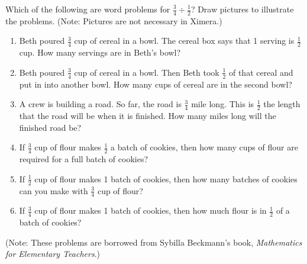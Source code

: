 \documentclass{ximera}
\begin{document}
\newpage 
\begin{problem}
Which of the following are word problems for $\frac{3}{4} \div \frac{1}{2}$?  Draw pictures to illustrate the problems.  (Note: Pictures are not necessary in Ximera.)

\begin{enumerate}
\item Beth poured $\frac{3}{4}$ cup of cereal in a bowl.  The cereal box says that 1 serving is $\frac{1}{2}$ cup.  How many servings are in Beth's bowl? 

\item Beth poured $\frac{3}{4}$ cup of cereal in a bowl.  Then Beth took $\frac{1}{2}$ of that cereal and put in into another bowl.  How many cups of cereal are in the second bowl? 

\item A crew is building a road.  So far, the road is $\frac{3}{4}$ mile long.  This is $\frac{1}{2}$ the length that the road will be when it is finished.  How many miles long will the finished road be? 
\item If $\frac{3}{4}$ cup of flour makes $\frac{1}{2}$ a batch of cookies, then how many cups of flour are required for a full batch of cookies?  

\item If $\frac{1}{2}$ cup of flour makes 1 batch of cookies, then how many batches of cookies can you make with $\frac{3}{4}$ cup of flour?  

\item If $\frac{3}{4}$ cup of flour makes 1 batch of cookies, then how much flour is in $\frac{1}{2}$ of a batch of cookies? 

\end{enumerate}
(Note:  These problems are borrowed from Sybilla Beckmann's book, \emph{Mathematics for Elementary Teachers}.)
\begin{freeResponse}
\end{freeResponse}

\end{problem}
\end{document}
